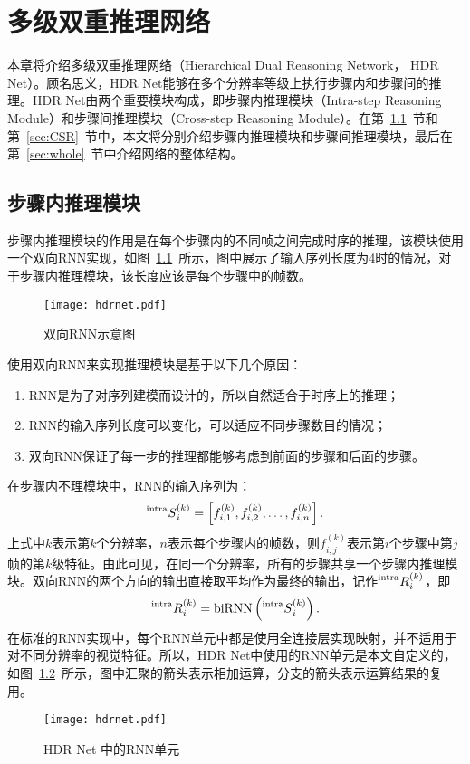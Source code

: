 
\chapter{多级双重推理网络}\label{cha:HDRNet}
本章将介绍多级双重推理网络（Hierarchical Dual Reasoning Network， HDR Net）。顾名思义，HDR Net能够在多个分辨率等级上执行步骤内和步骤间的推理。HDR Net由两个重要模块构成，即步骤内推理模块（Intra-step Reasoning Module）和步骤间推理模块（Cross-step Reasoning Module）。在第~\ref{sec:ISR}~节和第~\ref{sec:CSR}~节中，本文将分别介绍步骤内推理模块和步骤间推理模块，最后在第~\ref{sec:whole}~节中介绍网络的整体结构。
\section{步骤内推理模块}\label{sec:ISR}
步骤内推理模块的作用是在每个步骤内的不同帧之间完成时序的推理，该模块使用一个双向RNN实现，如图~\ref{fig:birnn}~所示，图中展示了输入序列长度为4时的情况，对于步骤内推理模块，该长度应该是每个步骤中的帧数。
\begin{figure}[htbp]
    \centering
    \texttt{[image: hdrnet.pdf]}
    \caption{双向RNN示意图}
    \label{fig:birnn}
\end{figure}
使用双向RNN来实现推理模块是基于以下几个原因：
\begin{enumerate}
    \item RNN是为了对序列建模而设计的，所以自然适合于时序上的推理；
    \item RNN的输入序列长度可以变化，可以适应不同步骤数目的情况；
    \item 双向RNN保证了每一步的推理都能够考虑到前面的步骤和后面的步骤。
\end{enumerate}

在步骤内不理模块中，RNN的输入序列为：
\begin{equation}
    \prescript{\mathrm{intra}}{}{S}^{(k)}_i = \left[f^{(k)}_{i, 1}, f^{(k)}_{i, 2}, \ldots, f^{(k)}_{i, n}\right].
\end{equation}
上式中$k$表示第$k$个分辨率，$n$表示每个步骤内的帧数，则$f^{(k)}_{i, j}$表示第$i$个步骤中第$j$帧的第$k$级特征。由此可见，在同一个分辨率，所有的步骤共享一个步骤内推理模块。双向RNN的两个方向的输出直接取平均作为最终的输出，记作$\prescript{\mathrm{intra}}{}{R}^{(k)}_i$，即
\begin{equation}
    \prescript{\mathrm{intra}}{}{R}^{(k)}_i = \operatorname{biRNN}\left(\prescript{\mathrm{intra}}{}{S}^{(k)}_i\right).
\end{equation}
在标准的RNN实现中，每个RNN单元中都是使用全连接层实现映射，并不适用于对不同分辨率的视觉特征。所以，HDR Net中使用的RNN单元是本文自定义的，如图~\ref{fig:rnn_cell}~所示，图中汇聚的箭头表示相加运算，分支的箭头表示运算结果的复用。
\begin{figure}[htbp]
    \centering
    \texttt{[image: hdrnet.pdf]}
    \caption{HDR Net 中的RNN单元}
    \label{fig:rnn_cell}
\end{figure}

